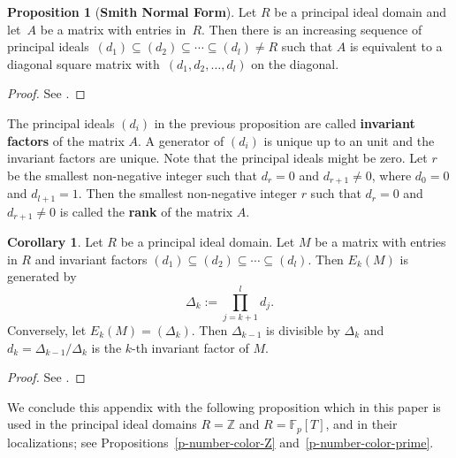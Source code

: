 \documentclass[11pt,a4paper]{article}
\theoremstyle{definition}
\newtheorem{corollary}[theorem]{Corollary}
\newtheorem{proposition}[theorem]{Proposition}
\newcommand{\numberset}{\mathbb}
\newcommand{\F}{\numberset{F}}
\newcommand{\Z}{\numberset{Z}}
\begin{document}
\begin{proposition}[{\bf Smith Normal Form}]\label{p-struct-pid}
Let $R$ be a principal ideal domain and let~$A$ be a matrix with entries in~$R$.
Then there is an increasing sequence of principal ideals~$(d_1)\subseteq (d_2)\subseteq \cdots \subseteq (d_l)\not= R $ 
such that $A$ is equivalent to a diagonal square matrix with~$(d_1, d_2, \ldots ,d_l) $ on the diagonal.
\end{proposition}
\begin{proof}
See \cite[Theorem II.9]{newman1972}.
\end{proof}

The principal ideals  $(d_i)$ in the previous proposition are called  \textbf{invariant factors} of the matrix $A$.
A generator of $(d_i)$ is unique up to an unit and the invariant factors are unique.
Note that the
principal ideals might be zero. 
Let $r$ be the smallest non-negative integer such that $d_{r}=0$ and $d_{r+1} \not= 0$,
where
$d_0=0$ and $d_{l+1}=1$. 
Then the smallest non-negative integer $r$ such that $d_{r}=0$ and $d_{r+1} \not= 0$
is called the \textbf{rank} of the matrix $A$.


\begin{corollary}\label{c-struct-pid}
Let $R$ be a principal ideal domain. Let $M$ be a matrix with entries in $R$
and invariant factors $(d_1)\subseteq (d_2)\subseteq \cdots \subseteq (d_l)$.
Then $E_k(M)$ is generated by $$\Delta_k:=\prod_{j=k+1}^l d_j.$$
Conversely, let $E_k(M)=(\Delta_k)$. Then $\Delta_{k-1}$ is divisible by  $\Delta_k$ and $d_k =\Delta_{k-1}/\Delta_k$ is the $k$-th invariant factor of $M$.
\end{corollary}
\begin{proof}
See \cite[Chapter II \S 15 and \S 16]{newman1972}.
\end{proof}


We conclude this appendix with the following proposition which in this paper is used in the principal ideal domains $R=\Z$ and $R=\F_p[T]$, and in their localizations; see Propositions~\ref{p-number-color-Z} and~\ref{p-number-color-prime}.
\end{document}
